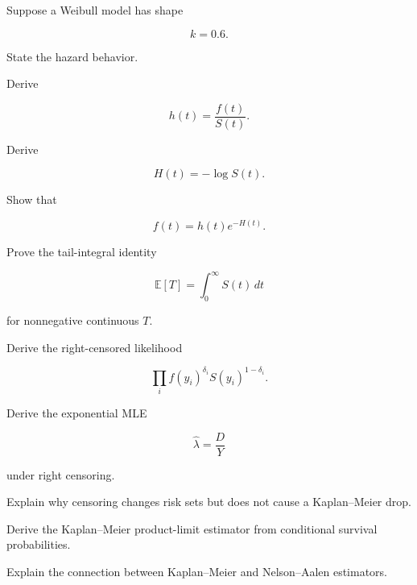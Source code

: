 \begin{exercise}[2]
Suppose a Weibull model has shape

\[
k=0.6.
\]

State the hazard behavior.
\end{exercise}

\begin{exercise}[3]
Derive

\[
h(t)
=
\frac{
f(t)
}{
S(t)
}.
\]
\end{exercise}

\begin{exercise}[3]
Derive

\[
H(t)
=
-\log S(t).
\]
\end{exercise}

\begin{exercise}[3]
Show that

\[
f(t)
=
h(t)e^{-H(t)}.
\]
\end{exercise}

\begin{exercise}[3]
Prove the tail-integral identity

\[
\mathbb{E}[T]
=
\int_0^\infty
S(t)\,dt
\]

for nonnegative continuous \(T\).
\end{exercise}

\begin{exercise}[3]
Derive the right-censored likelihood

\[
\prod_i
f(y_i)^{\delta_i}
S(y_i)^{1-\delta_i}.
\]
\end{exercise}

\begin{exercise}[3]
Derive the exponential MLE

\[
\widehat{\lambda}
=
\frac{
D
}{
Y
}
\]

under right censoring.
\end{exercise}

\begin{exercise}[3]
Explain why censoring changes risk sets but does not cause a Kaplan--Meier
drop.
\end{exercise}

\begin{exercise}[3]
Derive the Kaplan--Meier product-limit estimator from conditional
survival probabilities.
\end{exercise}

\begin{exercise}[3]
Explain the connection between Kaplan--Meier and Nelson--Aalen
estimators.
\end{exercise}

